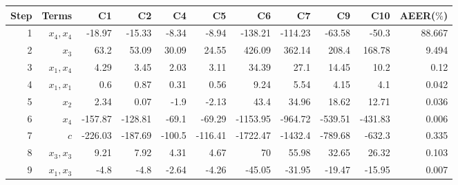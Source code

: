 \begin{tabular}{rrrrrrrrrrr}
Step & Terms & C1 & C2 & C4 & C5 & C6 & C7 & C9 & C10 & AEER($\%$) \\ 
\hline 
1 & $x_4,x_4$ & -18.97 & -15.33 & -8.34 & -8.94 & -138.21 & -114.23 & -63.58 & -50.3 & 88.667 \\ 
2 & $x_3$ & 63.2 & 53.09 & 30.09 & 24.55 & 426.09 & 362.14 & 208.4 & 168.78 & 9.494 \\ 
3 & $x_1,x_4$ & 4.29 & 3.45 & 2.03 & 3.11 & 34.39 & 27.1 & 14.45 & 10.2 & 0.12 \\ 
4 & $x_1,x_1$ & 0.6 & 0.87 & 0.31 & 0.56 & 9.24 & 5.54 & 4.15 & 4.1 & 0.042 \\ 
5 & $x_2$ & 2.34 & 0.07 & -1.9 & -2.13 & 43.4 & 34.96 & 18.62 & 12.71 & 0.036 \\ 
6 & $x_4$ & -157.87 & -128.81 & -69.1 & -69.29 & -1153.95 & -964.72 & -539.51 & -431.83 & 0.006 \\ 
7 & $c$ & -226.03 & -187.69 & -100.5 & -116.41 & -1722.47 & -1432.4 & -789.68 & -632.3 & 0.335 \\ 
8 & $x_3,x_3$ & 9.21 & 7.92 & 4.31 & 4.67 & 70 & 55.98 & 32.65 & 26.32 & 0.103 \\ 
9 & $x_1,x_3$ & -4.8 & -4.8 & -2.64 & -4.26 & -45.05 & -31.95 & -19.47 & -15.95 & 0.007 \\ 
\hline 
\end{tabular}